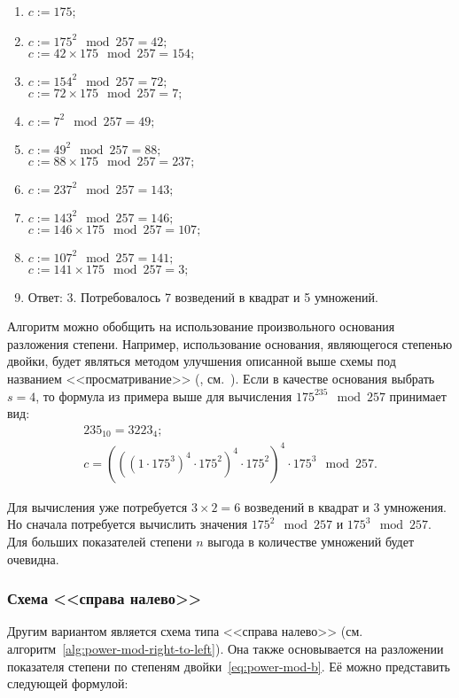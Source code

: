 \begin{enumerate}
	\item $c := 175$;
	\item $c := 175^2 \mod 257 = 42; $\\
		$c := 42 \times 175 \mod 257 = 154;$
	\item $c := 154^2 \mod 257 = 72; $\\
		$c := 72 \times 175 \mod 257 = 7;$
	\item $c := 7^2 \mod 257 = 49; $
	\item $c := 49^2 \mod 257 = 88; $\\
		$c := 88 \times 175 \mod 257 = 237;$
	\item $c := 237^2 \mod 257 = 143; $
	\item $c := 143^2 \mod 257 = 146; $\\
		$c := 146 \times 175 \mod 257 = 107;$
	\item $c := 107^2 \mod 257 = 141; $\\
		$c := 141 \times 175 \mod 257 = 3;$
	\item Ответ: 3. Потребовалось 7 возведений в квадрат и 5 умножений.
\end{enumerate}
\exampleend

Алгоритм можно обобщить на использование произвольного основания разложения степени. Например, использование основания, являющегося степенью двойки, будет являться методом улучшения описанной выше схемы под названием <<просматривание>> (, см.~\cite[9.3.2. Улучшение схем возведение в степень]{Crandall:Pomerance:2011}). Если в качестве основания выбрать $s = 4$, то формула из примера выше для вычисления $175^{235} \mod 257$ принимает вид:
\[\begin{array}{l}
	235_{10} = 3223_{4}; \\
	c = \left(\left(\left( 1 \cdot 175^3 \right)^4 \cdot 175^2 \right)^4 \cdot 175^2 \right)^4 \cdot 175^3 \mod 257.
\end{array}\]

Для вычисления уже потребуется $3 \times 2 = 6$ возведений в квадрат и $3$ умножения. Но сначала потребуется вычислить значения $175^2 \mod 257$ и $175^3 \mod 257$. Для больших показателей степени $n$ выгода в количестве умножений будет очевидна.

\subsubsection{Схема <<справа налево>>}
Другим вариантом является схема типа <<справа налево>> (см. алгоритм~\ref{alg:power-mod-right-to-left}). Она также основывается на разложении показателя степени по степеням двойки~\ref{eq:power-mod-b}. Её можно представить следующей формулой:

